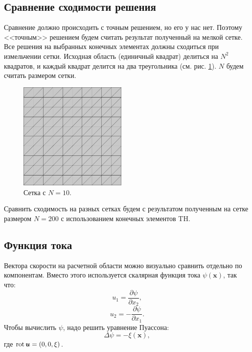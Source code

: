 \documentclass[12pt]{article}
\newcommand{\rot}{\mathop{\rm rot}\nolimits}
\begin{document}
\subsection{Сравнение сходимости решения}
Сравнение должно происходить с точным решением, но его у нас нет. Поэтому <<точным>> решением будем считать результат полученный на мелкой сетке. Все решения на выбранных конечных элементах должны сходиться при измельчении сетки. Исходная область (единичный квадрат) делиться на $N^2$ квадратов, и каждый квадрат делится на два треугольника (см. рис. \ref{fg:mesh}). $N$ будем считать размером сетки.

\begin{figure}
	\begin{center}
		\includegraphics[width=200px]{pics/mesh}
		\caption{Сетка с $N=10$.}
		\label{fg:mesh}
	\end{center}
\end{figure}

Сравнить сходимость на разных сетках будем с результатом полученным на сетке размером $N=200$ с использованием конечных элементов TH. 

\subsection{Функция тока}
Вектора скорости на расчетной области можно визуально сравнить отдельно по компонентам. Вместо этого используется скалярная функция тока $\psi({\bm x})$, так что:
\begin{equation}
u_1 = \frac{\partial \psi}{\partial x_2},
\end{equation}
\begin{equation}
u_2 = - \frac{\partial \psi}{\partial x_1}.
\end{equation}
Чтобы вычислить $\psi$, надо решить уравнение Пуассона:
\begin{equation}
\Delta\psi=-\xi({\bm x}),
\end{equation}
где $\rot {\bm u} = (0, 0, \xi)$.
\end{document}
